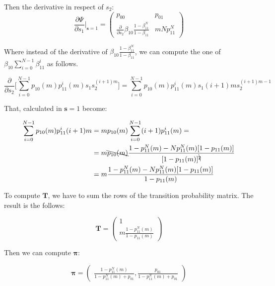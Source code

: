 Then the derivative in respect of $s_2$:
\begin{equation*}
	\frac{\partial\Psi}{\partial s_1}\bigg|_{\mathbf{s} = 1} =
	\begin{pmatrix}
		p_{00} & p_{01}\\
		\frac{\partial}{\partial s_2}\beta_{10}\frac{1-\beta_{11}^N}{1-\beta_{11}} & mNp_{11}^N
	\end{pmatrix}
\end{equation*}

Where instead of the derivative of $\beta_{10}\frac{1-\beta_{11}^N}{1-\beta_{11}}$, we can compute the one of $\beta_{10}\sum_{i=0}^{N-1}\beta_{11}^i$ as follows.

\begin{equation*}
	\frac{\partial}{\partial s_2}\bigg[\sum_{i=0}^{N-1}p_{10}(m)p_{11}^i(m)s_1s_2^{(i+1)m}\bigg] = \sum_{i=0}^{N-1}p_{10}(m)p_{11}^i(m)s_1(i+1)ms_2^{(i+1)m-1}
\end{equation*}

That, calculated in $\mathbf{s} = 1$ become:

\begin{equation*}
	\begin{split}
		\sum_{i=0}^{N-1}p_{10}(m)p_{11}^i(i+1)m &= mp_{10}(m)\sum_{i=0}^{N-1}(i+1)p_{11}^i(m) = \\
		&=m\bcancel{p_{10}(m)}\frac{1-p_{11}^N(m)-Np_{11}^N(m)[1-p_{11}(m)]}{[1-p_{11}(m)]^{\bcancel{2}}}\\
		&=m\frac{1-p_{11}^N(m)-Np_{11}^N(m)[1-p_{11}(m)]}{1-p_{11}(m)}
	\end{split}
\end{equation*}

To compute $\mathbf{T}$, we have to sum the rows of the transition probability matrix. The result is the follows:

\begin{equation}
\mathbf{T} =
	\begin{pmatrix}
		1 \\
		m\frac{1-p_{11}^N(m)}{1-p_{11}(m)}
	\end{pmatrix}
\end{equation}

Then we can compute $\mathbf{\pi}$:

\begin{equation}
\mathbf{\pi} =
	\begin{pmatrix}
		\frac{1-p_{11}^N(m)}{1-p_{11}^N(m) + p_{01}} ,
		\frac{p_{01}}{1-p_{11}^N(m) + p_{01}}
	\end{pmatrix}
\end{equation}

